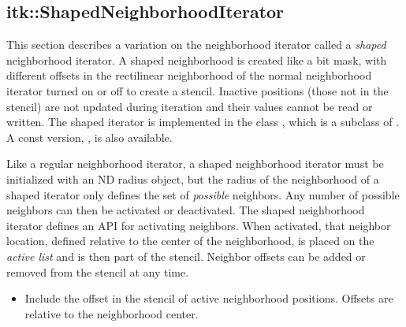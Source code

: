 {%


\subsection{itk::ShapedNeighborhoodIterator}
\label{sec:itkShapedNeighborhoodIterator}
This section describes a variation on the neighborhood iterator called a
\emph{shaped} neighborhood iterator.  A shaped neighborhood is created like
a bit mask, with different offsets in the rectilinear neighborhood of
the normal neighborhood iterator turned on or off to create a stencil.
Inactive positions (those not in the stencil) are not updated during iteration and
their values cannot be read or written.  The shaped iterator is implemented in
the class , which is a subclass of
.  A const version,
, is also available.

Like a regular neighborhood iterator, a shaped neighborhood iterator must be
initialized with an ND radius object, but the radius of the neighborhood of a
shaped iterator only defines the set of \emph{possible} neighbors.  Any number
of possible neighbors can then be activated or deactivated.  The shaped
neighborhood iterator defines an API for activating neighbors.  When activated,
that neighbor location, defined relative to the center of the neighborhood, is
placed on the \emph{active list} and is then part of the stencil.  Neighbor
offsets can be added or removed from the stencil at any time.

\begin{itemize}

\item \textbf{} Include the offset
 in the stencil of active neighborhood positions.  Offsets are relative
to the neighborhood center.


\end{itemize}}
